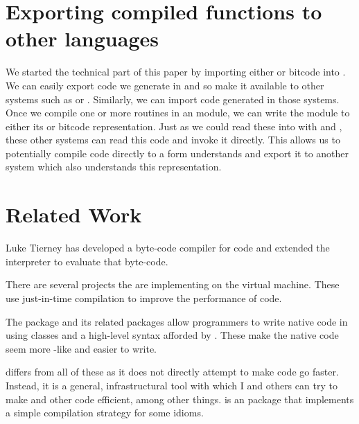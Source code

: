 \section[Exporting compiled R functions to other languages]{Exporting compiled \R{} functions to other languages}

We started the technical part of this paper by importing either \IR{}
or bitcode into \R.  We can easily
export \llvm{} code we generate in \R{} and so make it available to other
systems such as \Python{} or \Matlab. Similarly, we can import \llvm{}
code generated in those systems. Once we compile one or more routines
in an \llvm{} module, we can write the module to either its \IR{} or
bitcode representation.  Just as we could read these into \R{} with
 and , these other systems can read
this code and invoke it directly.  This allows us to potentially
compile \R{} code directly to a form \llvm{} understands and export it
to another system which also understands this \llvm{} representation.


\section{Related Work}
Luke Tierney has developed a byte-code compiler for \R{} code
and extended the \R{} interpreter to evaluate that byte-code.

There are several projects the are implementing \R{} on the \Java{}
virtual machine.  These use just-in-time compilation to improve the
performance of code.

The  package and its related packages allow \R{}
programmers to write native code in \Cpp{} using classes and a
high-level syntax afforded by \Cpp{}.  These make the native code seem
more \R{}-like and easier to write.

\Rllvm{} differs from all of these as it does not directly attempt to
make \R{} code go faster. Instead, it is a general, infrastructural
tool with which I and others can try to make \R{} and other code
efficient, among other things.  is an \R{} package
that implements a simple compilation strategy for some \R{} idioms.


